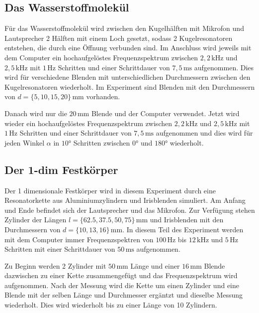\subsection{Das Wasserstoffmolekül}
\label{sec:d_H2}

Für das Wasserstoffmolekül wird zwischen den Kugelhälften mit Mikrofon und Lautsprecher 2 Hälften mit einem Loch gesetzt, sodass 2 Kugelresonatoren entstehen, die durch eine Öffnung verbunden sind. Im Anschluss wird jeweils mit dem Computer ein hochaufgelöstes Frequenzspektrum zwischen $2, \! 2 \, \mathrm{kHz}$ und $2, \! 5 \, \mathrm{kHz}$ mit $1 \, \mathrm{Hz}$ Schritten und einer Schrittdauer von $7, \! 5 \, \mathrm{ms}$ aufgenommen. Dies wird für verschiedene Blenden mit unterschiedlichen Durchmessern zwischen den Kugelresonatoren wiederholt. Im Experiment sind Blenden mit den Durchmessern von $d = \{ 5, 10, 15, 20 \} \, \mathrm{mm}$ vorhanden. \newline

Danach wird nur die $20 \, \mathrm{mm}$ Blende und der Computer verwendet. Jetzt wird wieder ein hochaufgelöstes Frequenzspektrum zwischen $2, \! 2 \, \mathrm{kHz}$ und $2, \! 5 \, \mathrm{kHz}$ mit $1 \, \mathrm{Hz}$ Schritten und einer Schrittdauer von $7, \! 5 \, \mathrm{ms}$ aufgenommen und dies wird für jeden Winkel $\alpha$ in $10°$ Schritten zwischen $0°$ und $180°$ wiederholt.

\subsection{Der 1-dim Festkörper}
\label{sec:d_fk}

Der 1 dimensionale Festkörper wird in diesem Experiment durch eine Resonatorkette aus Aluminiumzylindern und Irisblenden simuliert. Am Anfang und Ende befindet sich der Lautsprecher und das Mikrofon. Zur Verfügung stehen Zylinder der Längen $l = \{ 62.5, 37.5, 50, 75 \} \, \mathrm{mm}$ und Irisblenden mit den Durchmessern von $d = \{ 10, 13, 16 \} \, \mathrm{mm}$. In diesem Teil des Experiment werden mit dem Computer immer Frequenzspektren von $100 \, \mathrm{Hz}$ bis $12 \, \mathrm{kHz}$ und $5 \, \mathrm{Hz}$ Schritten mit einer Schrittdauer von $50 \, \mathrm{ms}$ aufgenommen. \newline

Zu Beginn werden 2 Zylinder mit $50 \, \mathrm{mm}$ Länge und einer $16 \, \mathrm{mm}$ Blende dazwischen zu einer Kette zusammengefügt und das Frequenzspektrum wird aufgenommen. Nach der Messung wird die Kette um einen Zylinder und eine Blende mit der selben Länge und Durchmesser ergäntzt und dieselbe Messung wiederholt. Dies wird wiederholt bis zu einer Länge von 10 Zylindern. \newline


